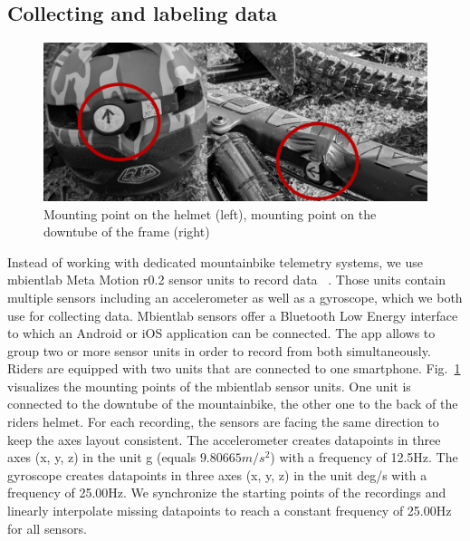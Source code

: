 \documentclass[runningheads]{llncs}
\begin{document}
\subsection{Collecting and labeling data}

\begin{figure}
\includegraphics[width=\textwidth]{mountingpoints.jpg}
\caption{Mounting point on the helmet (left), mounting point on the downtube of the frame (right)}
\label{fig1}	
\end{figure}

Instead of working with dedicated mountainbike telemetry systems, we use mbientlab Meta Motion r0.2 sensor units to record data ~\cite{mbientlab}.
Those units contain multiple sensors including an accelerometer as well as a gyroscope, which we both use for collecting data.
Mbientlab sensors offer a Bluetooth Low Energy interface to which an Android or iOS application can be connected.
The app allows to group two or more sensor units in order to record from both simultaneously.
Riders are equipped with two units that are connected to one smartphone.
Fig.~\ref{fig1} visualizes the mounting points of the mbientlab sensor units.
One unit is connected to the downtube of the mountainbike, the other one to the back of the riders helmet.
For each recording, the sensors are facing the same direction to keep the axes layout consistent.
The accelerometer creates datapoints in three axes (x, y, z) in the unit g (equals $9.80665 m/s^2$) with a frequency of 12.5Hz.
The gyroscope creates datapoints in three axes (x, y, z) in the unit deg/s with a frequency of 25.00Hz.
We synchronize the starting points of the recordings and linearly interpolate missing datapoints to reach a constant frequency of 25.00Hz for all sensors.
\end{document}
